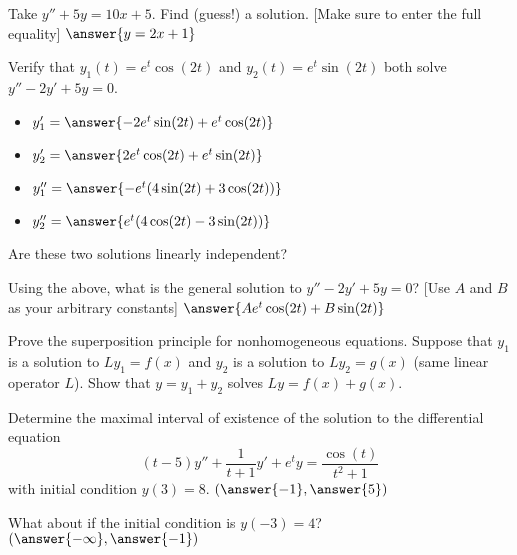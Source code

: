 \documentclass{ximera}
\begin{document}
\begin{exercise}
    Take $y'' + 5 y = 10 x + 5$.  Find (guess!) a solution. [Make sure to enter the full equality] $\answer{y = 2x+1}$ 
\end{exercise}

\begin{exercise}
    Verify that $y_1(t) = e^t \cos(2t)$ and $y_2(t) = e^t \sin(2t)$ both solve $y'' - 2y' + 5y = 0$. 
    
    \begin{itemize}
        \item $y_1' = \answer{-2e^t\sin(2t) + e^t\cos(2t)}$
        \item $y_2' = \answer{2e^t\cos(2t) + e^t\sin(2t)}$
        \item $y_1'' = \answer{-e^t (4 \sin(2t) + 3 \cos(2t))}$
        \item $y_2'' = \answer{e^t (4 \cos(2t) - 3 \sin(2t))}$
    \end{itemize}
    
    \begin{problem}
        Are these two solutions linearly independent? 
        \begin{multipleChoice}
        \end{multipleChoice}
        \begin{problem}
            Using the above, what is the general solution to $y'' - 2y' + 5y = 0$? [Use $A$ and $B$ as your arbitrary constants] $\answer{Ae^{t}\cos(2t) + B\sin(2t)}$
        \end{problem}
    \end{problem}
\end{exercise}

\begin{exercise}
    Prove the superposition principle for nonhomogeneous equations.  Suppose that $y_1$ is a solution to $L y_1 = f(x)$ and $y_2$ is a solution to $L y_2 = g(x)$ (same linear operator $L$).  Show that $y = y_1+y_2$ solves $Ly = f(x) + g(x)$.
\end{exercise}

\begin{exercise}
    Determine the maximal interval of existence of the solution to the differential equation
    \[ 
        (t - 5)y'' + \frac{1}{t+1}y' + e^t y = \frac{\cos(t)}{t^2 + 1} 
    \] 
    with initial condition $y(3) = 8$. $\left( \answer{-1},\answer{5} \right)$
    
    \begin{problem}
        What about if the initial condition is $y(-3) = 4$? $\left( \answer{-\infty},\answer{-1} \right)$
    \end{problem}
\end{exercise}
\end{document}
